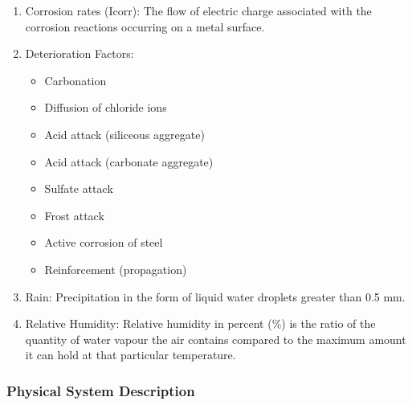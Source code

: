 \documentclass[12pt]{article}
\begin{document}
\begin{enumerate}
    \item Corrosion rates (Icorr): The flow of electric charge associated with the corrosion reactions occurring on a metal surface.

    \item Deterioration Factors:
    \begin{itemize}
        \item Carbonation
    \end{itemize}
    \begin{itemize}
        \item Diffusion of chloride ions
    \end{itemize}
    \begin{itemize}
        \item Acid attack (siliceous aggregate)
    \end{itemize}
    \begin{itemize}
        \item Acid attack (carbonate aggregate)
    \end{itemize}
    \begin{itemize}
        \item Sulfate attack
    \end{itemize}
    \begin{itemize}
        \item Frost attack
    \end{itemize}
    \begin{itemize}
        \item Active corrosion of steel
    \end{itemize}
    \begin{itemize}
        \item Reinforcement (propagation)
    \end{itemize}

    \item Rain: Precipitation in the form of liquid water droplets greater than 0.5 mm. 

    \item Relative Humidity: Relative humidity in percent (\%) is the ratio of the quantity of water vapour the air contains compared to the maximum amount it can hold at that particular temperature. 
\end{enumerate}

\subsubsection{Physical System Description} \label{sec_phySystDescrip}
\end{document}
